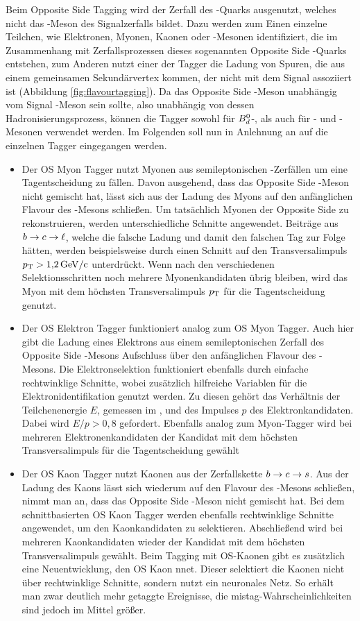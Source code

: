 Beim Opposite Side Tagging wird der Zerfall des \bquark-Quarks ausgenutzt, welches nicht das \B-Meson des Signalzerfalls bildet. Dazu werden zum Einen einzelne Teilchen, wie Elektronen, Myonen, Kaonen oder \D-Mesonen identifiziert, die im Zusammenhang mit Zerfallsprozessen dieses sogenannten Opposite Side \bquark-Quarks entstehen, zum Anderen nutzt einer der Tagger die Ladung von Spuren, die aus einem gemeinsamen Sekundärvertex kommen, der nicht mit dem Signal \B assoziiert ist (Abbildung \ref{fig:flavourtagging}). Da das Opposite Side \B-Meson unabhängig vom Signal \B-Meson sein sollte, also unabhängig von dessen Hadronisierungsprozess, können die Tagger sowohl für {{\ensuremath{\B^0_\dquark}}\xspace}-, als auch für  \Bs- und \Bu-Mesonen verwendet werden. Im Folgenden soll nun in Anlehnung an \cite{tagging} auf die einzelnen Tagger eingegangen werden.
\begin{itemize}
\item Der OS Myon Tagger nutzt Myonen aus semileptonischen \B-Zerfällen um eine Tagentscheidung zu fällen. Davon ausgehend, dass das Opposite Side \B-Meson nicht gemischt hat, lässt sich aus der Ladung des Myons auf den anfänglichen Flavour des \B-Mesons schließen. Um tatsächlich Myonen der Opposite Side zu rekonstruieren, werden unterschiedliche Schnitte angewendet. Beiträge aus $\bquark\rightarrow\cquark\rightarrow\lepton$, welche die falsche Ladung und damit den falschen Tag zur Folge hätten, werden beispielsweise durch einen Schnitt auf den Transversalimpuls $\pt>\SI{1{,}2}{GeV\per c}$ unterdrückt. Wenn nach den verschiedenen Selektionsschritten noch mehrere Myonenkandidaten übrig bleiben, wird das Myon mit dem höchsten Transversalimpuls $\pt$ für die Tagentscheidung genutzt.
\item Der OS Elektron Tagger funktioniert analog zum OS Myon Tagger. Auch hier gibt die Ladung eines Elektrons aus einem semileptonischen Zerfall des Opposite Side \B-Mesons Aufschluss über den anfänglichen Flavour des \B-Mesons. Die Elektronselektion funktioniert ebenfalls durch einfache rechtwinklige Schnitte, wobei zusätzlich hilfreiche Variablen für die Elektronidentifikation genutzt werden. Zu diesen gehört das Verhältnis der Teilchenenergie $E$, gemessen im \ecal, und des Impulses $p$ des Elektronkandidaten. Dabei wird $E/p>0{,}8$ gefordert. Ebenfalls analog zum Myon-Tagger wird bei mehreren Elektronenkandidaten der Kandidat mit dem höchsten Transversalimpuls \pt für die Tagentscheidung gewählt
\item Der OS Kaon Tagger nutzt Kaonen aus der Zerfallskette $\bquark\rightarrow\cquark\rightarrow\squark$. Aus der Ladung des Kaons lässt sich wiederum auf den Flavour des \B-Mesons schließen, nimmt man an, dass das Opposite Side \B-Meson nicht gemischt hat. Bei dem schnittbasierten OS Kaon Tagger werden ebenfalls rechtwinklige Schnitte angewendet, um den Kaonkandidaten zu selektieren. Abschließend wird bei mehreren Kaonkandidaten wieder der Kandidat mit dem höchsten Transversalimpuls \pt gewählt. Beim Tagging mit OS-Kaonen gibt es zusätzlich eine Neuentwicklung, den OS Kaon nnet. Dieser selektiert die Kaonen nicht über rechtwinklige Schnitte, sondern nutzt ein neuronales Netz. So erhält man zwar deutlich mehr getaggte Ereignisse, die mistag-Wahrscheinlichkeiten sind jedoch im Mittel größer.

\end{itemize}

